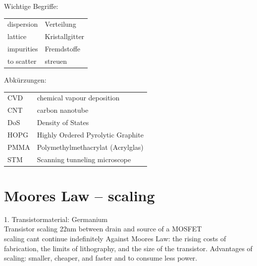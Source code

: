 \documentclass[fs, footer]{latex4ei}
\begin{document}
\begin{multicols}{4}
	
\vspace{-2mm} %



Wichtige Begriffe: 
\begin{tabular}{ll}
	dispersion & Verteilung\\
	lattice & Kristallgitter\\
	impurities & Fremdstoffe\\
	to scatter & streuen\\
\end{tabular}

Abkürzungen:
\begin{tabular}{ll}
	CVD & chemical vapour deposition\\
	CNT & carbon nanotube\\
	DoS & Density of States\\
	HOPG & Highly Ordered Pyrolytic Graphite\\
	PMMA & Polymethylmethacrylat (Acrylglas)\\
	STM & Scanning tunneling microscope\\
\end{tabular}


\section{Moores Law -- scaling}

1. Transistormaterial: Germanium\\
Transistor scaling 22nm between drain and source of a MOSFET\\
scaling cant continue indefinitely
Against Moores Law: the rising costs of fabrication, the limits of lithography, and the size of the transistor.
Advantages of scaling: smaller, cheaper, and faster and to consume less power.









\end{multicols}
\end{document}
